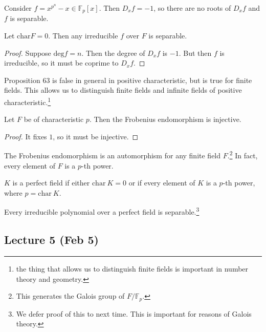 \documentclass[10pt, twoside]{article}
\newcommand{\F}{\mathbb{F}}
\begin{document}
    \begin{exm}
        Consider $f = x^{p^n}-x \in \F_p[x]$. Then $D_xf = -1$, so there are no roots of $D_xf$ and $f$ is separable.
    \end{exm}

    \begin{prop}
        Let $\mathrm{char} F = 0$. Then any irreducible $f$ over $F$ is separable.
        \begin{proof}
            Suppose $\mathrm{deg} f = n$. Then the degree of $D_xf$ is $-1$. But then $f$ is irreducible, so it must be coprime to $D_xf$.
        \end{proof}
    \end{prop}

    \begin{rmk}
        Proposition 63 is false in general in positive characteristic, but is true for finite fields. This allows us to distinguish finite fields and infinite fields of positive characteristic.\footnote{the thing that allows us to distinguish finite fields is important in number theory and geometry.}
    \end{rmk}

    \begin{prop}
        Let $F$ be of characteristic $p$. Then the Frobenius endomorphism is injective.
        \begin{proof}
            It fixes $1$, so it must be injective.
        \end{proof}
    \end{prop}

    \begin{cor}
        The Frobenius endomorphism is an automorphism for any finite field $F$.\footnote{This generates the Galois group of $F/\F_p$.} In fact, every element of $F$ is a $p$-th power.
    \end{cor}

    \begin{defn}
        $K$ is a perfect field if either $\mathrm{char}\ K = 0$ or if every element of $K$ is a $p$-th power, where $p = \mathrm{char}\ K$. 
    \end{defn}

    \begin{prop}
        Every irreducible polynomial over a perfect field is separable.\footnote{We defer proof of this to next time. This is important for reasons of Galois theory.}
    \end{prop}

    \subsection{Lecture 5 (Feb 5)}
    
\end{document}
